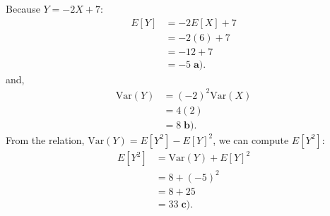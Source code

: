 \documentclass[a4paper, 10pt]{article}
\begin{document}
\begin{solution}
Because \( Y = -2X + 7 \):
\begin{align*}
    E[Y] &= -2E[X] + 7 \\
    &= -2(6) + 7 \\
    &= -12 + 7 \\
    &= \boxed{-5} \; \textbf{a).}
\end{align*}
and,
\begin{align*}
    \text{Var}(Y) &= (-2)^2 \text{Var}(X) \\
    &= 4(2) \\
    &= \boxed{8} \; \textbf{b).}
\end{align*}
From the relation, \( \text{Var}(Y) = E[Y^2] - E[Y]^2 \), we can compute \( E[Y^2] \):
\begin{align*}
    E[Y^2] &= \text{Var}(Y) + E[Y]^2 \\
    &= 8 + (-5)^2 \\
    &= 8 + 25 \\
    &= \boxed{33} \; \textbf{c).}
\end{align*}
\end{solution}
\end{document}
